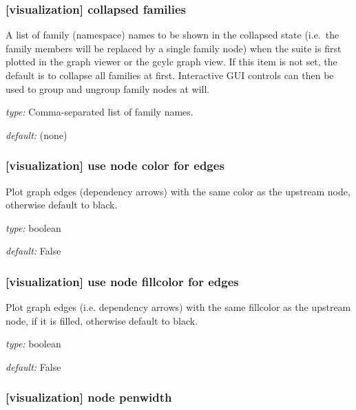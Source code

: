 \subsubsection[collapsed families]{[visualization] \textrightarrow collapsed families}

A list of family (namespace) names to be shown in the collapsed state
(i.e.\ the family members will be replaced by a single family node) when
the suite is first plotted in the graph viewer or the gcylc graph view.
If this item is not set, the default is to collapse all families at first.
Interactive GUI controls can then be used to group and ungroup family
nodes at will.

\begin{myitemize}
    \item {\em type:} Comma-separated list of family names.
    \item {\em default:} (none)
\end{myitemize}

\subsubsection[use node color for edges]{[visualization] \textrightarrow use node color for edges}

Plot graph edges (dependency arrows) with the same color as the upstream
node, otherwise default to black.

\begin{myitemize}
    \item {\em type:} boolean
    \item {\em default:} False
\end{myitemize}

\subsubsection[use node fillcolor for edges]{[visualization] \textrightarrow use node fillcolor for edges}

Plot graph edges (i.e. dependency arrows) with the same fillcolor as the
upstream node, if it is filled, otherwise default to black.

\begin{myitemize}
    \item {\em type:} boolean
    \item {\em default:} False
\end{myitemize}

\subsubsection[node penwidth]{[visualization] \textrightarrow node penwidth}

